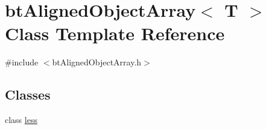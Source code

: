 \hypertarget{classbtAlignedObjectArray}{}\section{bt\+Aligned\+Object\+Array$<$ T $>$ Class Template Reference}
\label{classbtAlignedObjectArray}


{\ttfamily \#include $<$bt\+Aligned\+Object\+Array.\+h$>$}

\subsection*{Classes}
\begin{DoxyCompactItemize}
\item 
class \hyperlink{classbtAlignedObjectArray_1_1less}{less}
\end{DoxyCompactItemize}
